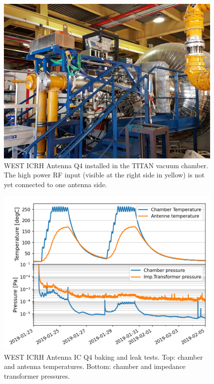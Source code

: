 \documentclass[12p]{iopart}
\begin{document}
\begin{figure}
	\centering
	\includegraphics[width=0.95\linewidth]{figures/titan}
	\caption{WEST ICRH Antenna Q4 installed in the TITAN vacuum chamber. The high power RF input (visible at the right side in yellow) is not yet connected to one antenna side.}
	\label{fig:titan}
\end{figure}


\begin{figure}
	\centering
	\includegraphics[width=0.95\linewidth]{figures/baking}
	\caption{WEST ICRH Antenna IC Q4 baking and leak tests. Top: chamber and antenna temperatures. Bottom: chamber and impedance transformer pressures.}
	\label{fig:baking}
\end{figure}
\end{document}

